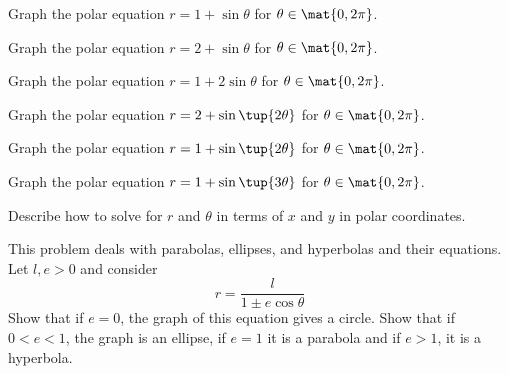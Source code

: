 \begin{enumialphparenastyle}
\begin{ex} Graph the polar equation $r=1+\sin \theta $ for $\theta \in \mat{0,2\pi}$.
\end{ex}

\begin{ex} Graph the polar equation $r=2+\sin \theta $ for $\theta \in \mat{0,2\pi}$.
\end{ex}

\begin{ex} Graph the polar equation $r=1+2\sin \theta $ for $\theta \in \mat{0,2\pi}$.
\end{ex}

\begin{ex} Graph the polar equation $r=2+\sin \tup{2\theta } $ for $\theta \in \mat{0,2\pi 
}$.
\end{ex}

\begin{ex} Graph the polar equation $r=1+\sin \tup{2\theta } $ for $\theta \in \mat{0,2\pi 
}$.
\end{ex}

\begin{ex} Graph the polar equation $r=1+\sin \tup{3\theta } $ for $\theta \in \mat{0,2\pi 
}$.
\end{ex}


\begin{ex} Describe how to solve for $r$ and $\theta $ in terms of $x$ and $y$ in polar
coordinates.
\end{ex}

\begin{ex} This problem deals with parabolas, ellipses, and
hyperbolas and their equations. Let $l,e>0$ and consider
\begin{equation*}
r=\frac{l}{1\pm e\cos \theta }
\end{equation*}
Show that if $e=0$, the graph of this equation gives a circle. Show that if $0<e<1$, the graph is an ellipse, if $e=1$
it is a parabola and if $e>1$, it is a hyperbola.
\end{ex}

\end{enumialphparenastyle}